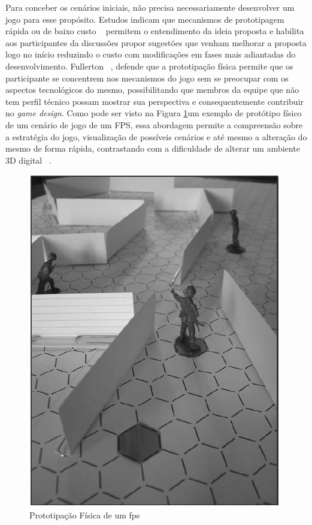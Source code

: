 Para conceber os cenários iniciais, não precisa necessariamente desenvolver um jogo para esse propósito. Estudos indicam que mecanismos de prototipagem rápida ou de baixo custo ~\cite{prototipgames2007,fullerton2008game} permitem o entendimento da ideia proposta e habilita aos participantes da discussões propor sugestões que venham melhorar a proposta logo no início reduzindo o custo com modificações em fases mais adiantadas do desenvolvimento. Fullerton ~\cite{fullerton2008game}, defende que a prototipação física permite que os participante se concentrem nos mecanismos do jogo sem se preocupar com os aspectos tecnológicos do mesmo, possibilitando que membros da equipe que não tem perfil técnico possam mostrar sua perspectiva e consequentemente contribuir no \textit{game design}. Como pode ser visto na Figura \ref{fig:proto-fps}um exemplo de protótipo físico de um cenário de jogo de um FPS, essa abordagem permite a compreensão sobre a estratégia do jogo, visualização de possíveis cenários e até mesmo a alteração do mesmo de forma rápida, contrastando com a dificuldade de alterar um ambiente 3D digital ~\cite{fullerton2008game}. 

\begin{figure}
 \centering
 \includegraphics[scale=0.55]{./img/fps-fisical-prototype.png}
\caption{Prototipação Física de um \ac{fps} ~\cite{fullerton2008game}}
 \label{fig:proto-fps}
\end{figure}


